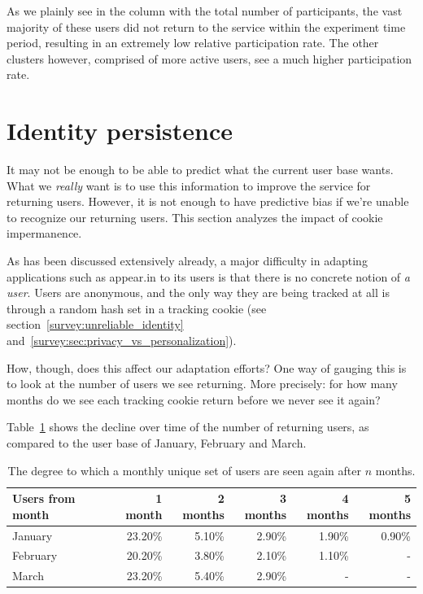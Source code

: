 As we plainly see in the column with the total number of participants, the vast majority of these users did not return to the service within the experiment time period, resulting in an extremely low relative participation rate.
The other clusters however, comprised of more active users, see a much higher participation rate.

\section{Identity persistence}
\label{eval:sec:identity_persistence}

It may not be enough to be able to predict what the current user base wants. What we \emph{really} want is to use this information to improve the service for returning users. However, it is not enough to have predictive bias if we're unable to recognize our returning users. This section analyzes the impact of cookie impermanence.

As has been discussed extensively already, a major difficulty in adapting applications such as appear.in to its users is that there is no concrete notion of \emph{a user}. Users are anonymous, and the only way they are being tracked at all is through a random hash set in a tracking cookie (see section~\ref{survey:unreliable_identity} and~\ref{survey:sec:privacy_vs_personalization}).

How, though, does this affect our adaptation efforts? One way of gauging this is to look at the number of users we see returning. More precisely: for how many months do we see each tracking cookie return before we never see it again?

Table~\ref{tab:returning_users} shows the decline over time of the number of returning users, as compared to the user base of January, February and March.

\begin{table}[h]
  \centering
  \begin{tabular}{|l|rrrrr|}
    \hline
    Users from month & 1 month & 2 months & 3 months & 4 months & 5 months \\ \hline
    January          & 23.20\% & 5.10\%   & 2.90\%   & 1.90\%   & 0.90\%   \\
    February         & 20.20\% & 3.80\%   & 2.10\%   & 1.10\%   & -        \\
    March            & 23.20\% & 5.40\%   & 2.90\%   & -        & -        \\ \hline
  \end{tabular}
  \caption{The degree to which a monthly unique set of users are seen again after $n$ months.}
  \label{tab:returning_users}
\end{table}

